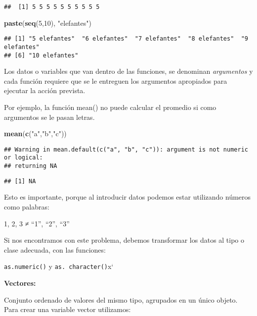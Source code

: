 \documentclass[
]{book}
\newenvironment{Shaded}{\begin{snugshade}}{\end{snugshade}}
\newcommand{\DecValTok}[1]{\textcolor[rgb]{0.00,0.00,0.81}{#1}}
\newcommand{\FunctionTok}[1]{\textcolor[rgb]{0.13,0.29,0.53}{\textbf{#1}}}
\newcommand{\NormalTok}[1]{#1}
\newcommand{\StringTok}[1]{\textcolor[rgb]{0.31,0.60,0.02}{#1}}
\begin{document}
\begin{verbatim}
##  [1] 5 5 5 5 5 5 5 5 5 5
\end{verbatim}

\begin{Shaded}
\begin{Highlighting}[]
\FunctionTok{paste}\NormalTok{(}\FunctionTok{seq}\NormalTok{(}\DecValTok{5}\NormalTok{,}\DecValTok{10}\NormalTok{), }\StringTok{"elefantes"}\NormalTok{)}
\end{Highlighting}
\end{Shaded}

\begin{verbatim}
## [1] "5 elefantes"  "6 elefantes"  "7 elefantes"  "8 elefantes"  "9 elefantes" 
## [6] "10 elefantes"
\end{verbatim}

Los datos o variables que van dentro de las funciones, se denominan
\emph{argumentos} y cada función requiere que se le entreguen los argumentos
apropiados para ejecutar la acción prevista.

Por ejemplo, la función mean() no puede calcular el promedio si como
argumentos se le pasan letras.

\begin{Shaded}
\begin{Highlighting}[]
\FunctionTok{mean}\NormalTok{(}\FunctionTok{c}\NormalTok{(}\StringTok{"a"}\NormalTok{,}\StringTok{"b"}\NormalTok{,}\StringTok{"c"}\NormalTok{))}
\end{Highlighting}
\end{Shaded}

\begin{verbatim}
## Warning in mean.default(c("a", "b", "c")): argument is not numeric or logical:
## returning NA
\end{verbatim}

\begin{verbatim}
## [1] NA
\end{verbatim}

Esto es importante, porque al introducir datos podemos estar utilizando
números como palabras:

1, 2, 3 ≠ ``1'', ``2'', ``3''

Si nos encontramos con este problema, debemos transformar los datos al
tipo o clase adecuada, con las funciones:

\texttt{as.numeric()} y \texttt{as.\ character()}x`

\textbf{Vectores:}

Conjunto ordenado de valores del mismo tipo, agrupados en un único
objeto. Para crear una variable vector utilizamos:
\end{document}
